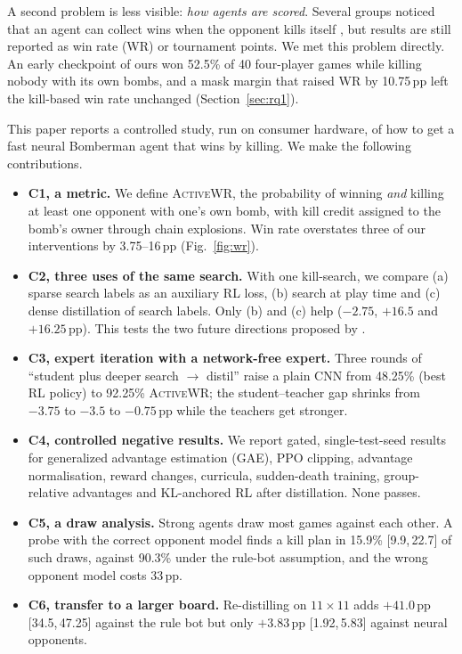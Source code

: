 \documentclass[11pt]{article}
\newcommand{\awr}{\textsc{ActiveWR}}
\newcommand{\pp}{\,pp}
\newcommand{\ci}[2]{[#1,\,#2]}
\begin{document}
A second problem is less visible: \emph{how agents are scored}. Several groups noticed that an agent can collect wins when the opponent kills itself \cite{gao2019skynet,kartal2018demonstrator,huynh2024,weil2023}, but results are still reported as win rate (WR) or tournament points. We met this problem directly. An early checkpoint of ours won 52.5\% of 40 four-player games while killing nobody with its own bombs, and a mask margin that raised WR by 10.75\pp{} left the kill-based win rate unchanged (Section~\ref{sec:rq1}).

This paper reports a controlled study, run on consumer hardware, of how to get a fast neural Bomberman agent that wins by killing. We make the following contributions.

\begin{itemize}
\item \textbf{C1, a metric.} We define \awr{}, the probability of winning \emph{and} killing at least one opponent with one's own bomb, with kill credit assigned to the bomb's owner through chain explosions. Win rate overstates three of our interventions by 3.75--16\pp{} (Fig.~\ref{fig:wr}).
\item \textbf{C2, three uses of the same search.} With one kill-search, we compare (a) sparse search labels as an auxiliary RL loss, (b) search at play time and (c) dense distillation of search labels. Only (b) and (c) help ($-2.75$, $+16.5$ and $+16.25$\pp{}). This tests the two future directions proposed by .
\item \textbf{C3, expert iteration with a network-free expert.} Three rounds of ``student plus deeper search $\rightarrow$ distil'' raise a plain CNN from 48.25\% (best RL policy) to 92.25\% \awr{}; the student--teacher gap shrinks from $-3.75$ to $-3.5$ to $-0.75$\pp{} while the teachers get stronger.
\item \textbf{C4, controlled negative results.} We report gated, single-test-seed results for generalized advantage estimation (GAE), PPO clipping, advantage normalisation, reward changes, curricula, sudden-death training, group-relative advantages and KL-anchored RL after distillation. None passes.
\item \textbf{C5, a draw analysis.} Strong agents draw most games against each other. A probe with the correct opponent model finds a kill plan in 15.9\% \ci{9.9}{22.7} of such draws, against 90.3\% under the rule-bot assumption, and the wrong opponent model costs 33\pp{}.
\item \textbf{C6, transfer to a larger board.} Re-distilling on $11\times11$ adds $+41.0$\pp{} \ci{34.5}{47.25} against the rule bot but only $+3.83$\pp{} \ci{1.92}{5.83} against neural opponents.
\end{itemize}
\end{document}
